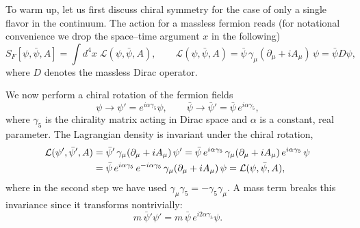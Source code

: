 To warm up, let us first discuss chiral symmetry for the case of only a single
flavor in the continuum. The action for a massless fermion reads (for
notational convenience we drop the space--time argument $x$ in the following)
\begin{equation}
  S_F[\psi,\bar\psi,A] = \int d^4x\;\mathcal{L}(\psi,\bar\psi,A),
  \qquad
  \mathcal{L}(\psi,\bar\psi,A) = \bar\psi\,\gamma_\mu(\partial_\mu + iA_\mu)\,\psi
  = \bar\psi D\psi,
\end{equation}
where $D$ denotes the massless Dirac operator.

We now perform a chiral rotation of the fermion fields
\begin{equation}
  \psi \to \psi' = e^{i\alpha\gamma_5}\psi,
  \qquad
  \bar\psi \to \bar\psi' = \bar\psi\,e^{i\alpha\gamma_5},
\end{equation}
where $\gamma_5$ is the chirality matrix acting in Dirac space and $\alpha$ is
a constant, real parameter. The Lagrangian density is invariant under the
chiral rotation,
\begin{align}
  \mathcal{L}(\psi',\bar\psi',A)
  &= \bar\psi'\,\gamma_\mu(\partial_\mu + iA_\mu)\,\psi'
  = \bar\psi\,e^{i\alpha\gamma_5}\,\gamma_\mu(\partial_\mu + iA_\mu)\,e^{i\alpha\gamma_5}\,\psi \notag\\
  &= \bar\psi\,e^{i\alpha\gamma_5}\,e^{-i\alpha\gamma_5}\,\gamma_\mu(\partial_\mu + iA_\mu)\,\psi
  = \mathcal{L}(\psi,\bar\psi,A),
\end{align}
where in the second step we have used $\gamma_\mu\gamma_5 = -\gamma_5\gamma_\mu$.
A mass term breaks this invariance since it transforms nontrivially:
\begin{equation}
  m\,\bar\psi'\psi' = m\,\bar\psi\,e^{i2\alpha\gamma_5}\psi.
\end{equation}

